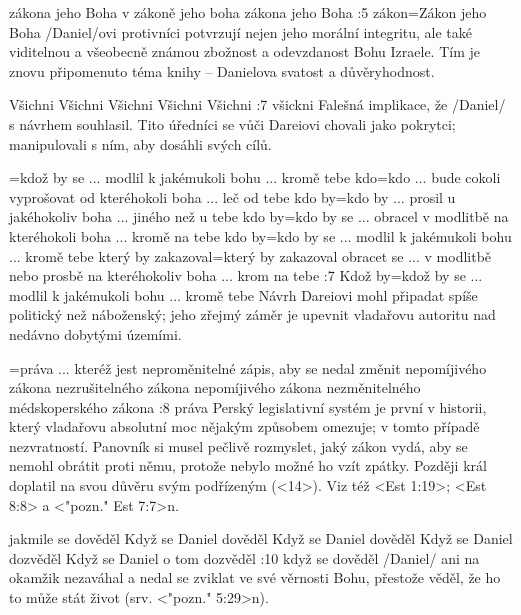     {zákona jeho Boha} %
    {v zákoně jeho boha}  %
    {zákona jeho Boha} %
    {}  %
    {}  %
:5 {zákon}={Zákon jeho Boha}  \x/Daniel/ovi protivníci potvrzují nejen jeho morální integritu, ale také viditelnou a všeobecně známou zbožnost a odevzdanost Bohu Izraele. Tím je znovu připomenuto téma knihy -- Danielova svatost a důvěryhodnost.

    {Všichni}  %
    {Všichni}  %
    {Všichni}  %
    {Všichni}  %
    {Všichni}  %
:7 {všickni} Falešná implikace, že \x/Daniel/ s návrhem souhlasil. Tito úředníci se vůči Dareiovi chovali jako pokrytci; manipulovali s ním, aby dosáhli svých cílů.   

={kdož by se ... modlil k jakémukoli bohu ... kromě tebe}  %
    {kdo}={kdo ... bude cokoli vyprošovat od kteréhokoli boha ... leč od tebe}  %
    {kdo by}={kdo by ... prosil u jakéhokoliv boha ... jiného než u tebe}  %
    {kdo by}={kdo by se ... obracel v modlitbě na kteréhokoli boha ... kromě na tebe}  %
    {kdo by}={kdo by se ... modlil k jakémukoli bohu ... kromě tebe}  %
    {který by zakazoval}={který by zakazoval obracet se ... v modlitbě nebo prosbě na kteréhokoliv boha ... krom na tebe}  %
:7 {Kdož by}={kdož by se ... modlil k jakémukoli bohu ... kromě tebe} Návrh Dareiovi mohl připadat spíše politický než náboženský; jeho zřejmý záměr je upevnit vladařovu autoritu nad nedávno dobytými územími. 

={práva ... kteréž jest neproměnitelné}  %
    {zápis, aby se nedal změnit}  %
    {nepomíjivého zákona}  %
    {nezrušitelného zákona}  %
    {nepomíjivého zákona}  %
    {nezměnitelného médskoperského zákona}  %
:8 {práva} Perský legislativní systém je první v historii, který vladařovu absolutní moc nějakým způsobem omezuje; v tomto případě nezvratností. Panovník si musel pečlivě rozmyslet, jaký zákon vydá, aby se nemohl obrátit proti němu, protože nebylo možné ho vzít zpátky.
Později král doplatil na svou důvěru svým podřízeným (<14>).
Viz též <Est 1:19>;  <Est 8:8> a <"pozn." Est 7:7>n.

    {jakmile se dověděl}  %
    {Když se Daniel dověděl}  %
    {Když se Daniel dověděl}  %
    {Když se Daniel dozvěděl}  %
    {Když se Daniel o tom dozvěděl}  %
:10 {když se dověděl}  \x/Daniel/ ani na okamžik nezaváhal a nedal se zviklat ve své věrnosti Bohu, přestože věděl, že ho to může stát život (srv. <"pozn." 5:29>n). 

